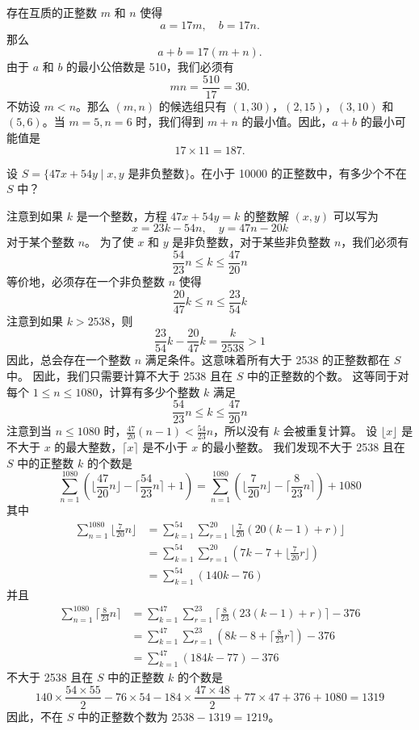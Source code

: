 \begin{questions}
\begin{solution}
存在互质的正整数 $m$ 和 $n$ 使得
\[
a = 17m, \quad b = 17n.
\]
那么
\[
a + b = 17(m + n).
\]
由于 $a$ 和 $b$ 的最小公倍数是 510，我们必须有
\[
mn = \frac{510}{17} = 30.
\]
不妨设 $m < n$。那么 $(m, n)$ 的候选组只有 $(1, 30)$，$(2, 15)$，$(3, 10)$ 和 $(5, 6)$。当 $m = 5, n = 6$ 时，我们得到 $m + n$ 的最小值。因此，$a + b$ 的最小可能值是
\[
17 \times 11 = 187.
\]
\end{solution}
\question
设 $S = \{47x + 54y \mid x, y \text{ 是非负整数}\}$。在小于 10000 的正整数中，有多少个不在 $S$ 中？

\begin{solution}
注意到如果 $k$ 是一个整数，方程 $47x + 54y = k$ 的整数解 $(x, y)$ 可以写为
\[
x = 23k - 54n, \quad y = 47n - 20k
\]
对于某个整数 $n$。
为了使 $x$ 和 $y$ 是非负整数，对于某些非负整数 $n$，我们必须有
\[
\frac{54}{23}n \le k \le \frac{47}{20}n
\]
等价地，必须存在一个非负整数 $n$ 使得
\[
\frac{20}{47}k \le n \le \frac{23}{54}k
\]
注意到如果 $k > 2538$，则
\[
\frac{23}{54}k - \frac{20}{47}k = \frac{k}{2538} > 1
\]
因此，总会存在一个整数 $n$ 满足条件。这意味着所有大于 2538 的正整数都在 $S$ 中。
因此，我们只需要计算不大于 2538 且在 $S$ 中的正整数的个数。
这等同于对每个 $1 \le n \le 1080$，计算有多少个整数 $k$ 满足
\[
\frac{54}{23}n \le k \le \frac{47}{20}n
\]
注意到当 $n \le 1080$ 时，$\frac{47}{20}(n - 1) < \frac{54}{23}n$，所以没有 $k$ 会被重复计算。
设 $\lfloor x \rfloor$ 是不大于 $x$ 的最大整数，$\lceil x \rceil$ 是不小于 $x$ 的最小整数。
我们发现不大于 2538 且在 $S$ 中的正整数 $k$ 的个数是
\[
\sum_{n=1}^{1080} \left( \lfloor \frac{47}{20}n \rfloor - \lceil \frac{54}{23}n \rceil + 1 \right) = \sum_{n=1}^{1080} \left( \lfloor \frac{7}{20}n \rfloor - \lceil \frac{8}{23}n \rceil \right) + 1080
\]
其中
\begin{align}
\sum_{n=1}^{1080} \lfloor \frac{7}{20}n \rfloor &= \sum_{k=1}^{54} \sum_{r=1}^{20} \lfloor \frac{7}{20}(20(k - 1) + r) \rfloor \\
&= \sum_{k=1}^{54} \sum_{r=1}^{20} \left( 7k - 7 + \lfloor \frac{7}{20}r \rfloor \right) \\
&= \sum_{k=1}^{54} (140k - 76)
\end{align}
并且
\begin{align}
\sum_{n=1}^{1080} \lceil \frac{8}{23}n \rceil &= \sum_{k=1}^{47} \sum_{r=1}^{23} \lceil \frac{8}{23}(23(k - 1) + r) \rceil - 376 \\
&= \sum_{k=1}^{47} \sum_{r=1}^{23} \left( 8k - 8 + \lceil \frac{8}{23}r \rceil \right) - 376 \\
&= \sum_{k=1}^{47} (184k - 77) - 376
\end{align}
不大于 2538 且在 $S$ 中的正整数 $k$ 的个数是
\[
140 \times \frac{54 \times 55}{2} - 76 \times 54 - 184 \times \frac{47 \times 48}{2} + 77 \times 47 + 376 + 1080 = 1319
\]
因此，不在 $S$ 中的正整数个数为 $2538 - 1319 = 1219$。
\end{solution}


\end{questions}

